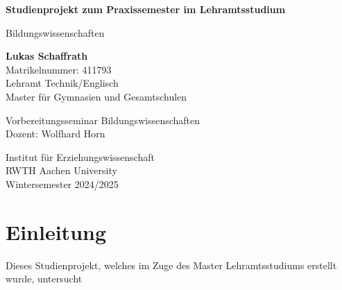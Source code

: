 \documentclass[12pt]{article}
\begin{document}
\begin{titlepage}
    \begin{center}
        \vspace*{0.5cm}
            
        \LARGE
        \textbf{Studienprojekt zum Praxissemester im Lehramtsstudium}
            
        \vspace{0.2cm}
        \Large
        Bildungswissenschaften
            
        \vspace{2cm}
            
        \textbf{Lukas Schaffrath}\\
        Matrikelnummer: 411793\\
        Lehramt Technik/Englisch\\
        Master für Gymnasien und Gesamtschulen
            
        \vspace{2cm}
        Vorbereitungsseminar Bildungswissenschaften\\            
        Dozent: Wolfhard Horn
            
        \vspace{2cm}
            
            
        \Large
        Institut für Erziehungswissenschaft\\
        RWTH Aachen University\\
        Wintersemester 2024/2025\\
        
    \end{center}
\end{titlepage}




\newpage
\setcounter{page}{1}
\pagestyle{maintext}

\section{Einleitung}
Dieses Studienprojekt, welches im Zuge des Master Lehramtsstudiums erstellt wurde, untersucht 
\end{document}
